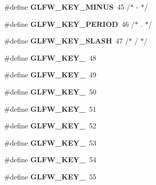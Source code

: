 \begin{DoxyCompactItemize}
\mbox{\label{group__keys_gac556b360f7f6fca4b70ba0aecf313fd4}} 
\#define {\bfseries G\+L\+F\+W\+\_\+\+K\+E\+Y\+\_\+\+M\+I\+N\+US}~45  /$\ast$ -\/ $\ast$/
\item 
\mbox{\label{group__keys_ga37e296b650eab419fc474ff69033d927}} 
\#define {\bfseries G\+L\+F\+W\+\_\+\+K\+E\+Y\+\_\+\+P\+E\+R\+I\+OD}~46  /$\ast$ . $\ast$/
\item 
\mbox{\label{group__keys_gadf3d753b2d479148d711de34b83fd0db}} 
\#define {\bfseries G\+L\+F\+W\+\_\+\+K\+E\+Y\+\_\+\+S\+L\+A\+SH}~47  /$\ast$ / $\ast$/
\item 
\mbox{\label{group__keys_ga50391730e9d7112ad4fd42d0bd1597c1}} 
\#define {\bfseries G\+L\+F\+W\+\_\+\+K\+E\+Y\+\_}~48
\item 
\mbox{\label{group__keys_ga05e4cae9ddb8d40cf6d82c8f11f2502f}} 
\#define {\bfseries G\+L\+F\+W\+\_\+\+K\+E\+Y\+\_}~49
\item 
\mbox{\label{group__keys_gadc8e66b3a4c4b5c39ad1305cf852863c}} 
\#define {\bfseries G\+L\+F\+W\+\_\+\+K\+E\+Y\+\_}~50
\item 
\mbox{\label{group__keys_ga812f0273fe1a981e1fa002ae73e92271}} 
\#define {\bfseries G\+L\+F\+W\+\_\+\+K\+E\+Y\+\_}~51
\item 
\mbox{\label{group__keys_ga9e14b6975a9cc8f66cdd5cb3d3861356}} 
\#define {\bfseries G\+L\+F\+W\+\_\+\+K\+E\+Y\+\_}~52
\item 
\mbox{\label{group__keys_ga4d74ddaa5d4c609993b4d4a15736c924}} 
\#define {\bfseries G\+L\+F\+W\+\_\+\+K\+E\+Y\+\_}~53
\item 
\mbox{\label{group__keys_ga9ea4ab80c313a227b14d0a7c6f810b5d}} 
\#define {\bfseries G\+L\+F\+W\+\_\+\+K\+E\+Y\+\_}~54
\item 
\mbox{\label{group__keys_gab79b1cfae7bd630cfc4604c1f263c666}} 
\#define {\bfseries G\+L\+F\+W\+\_\+\+K\+E\+Y\+\_}~55
\item 
\mbox{\label{group__keys_gadeaa109a0f9f5afc94fe4a108e686f6f}} 

\end{DoxyCompactItemize}
